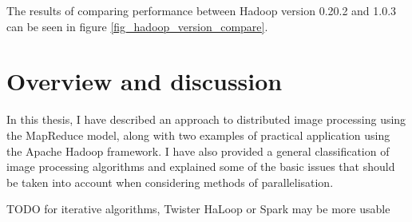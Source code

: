 \documentclass [12pt,a4paper]{report}
\begin{document}
The results of comparing performance between Hadoop version 0.20.2 and 1.0.3 can be seen in figure \ref{fig_hadoop_version_compare}.



\chapter{Overview and discussion}

In this thesis, I have described an approach to distributed image processing using the MapReduce model, along with two examples of practical application using the Apache Hadoop framework. I have also provided a general classification of image processing algorithms and explained some of the basic issues that should be taken into account when considering methods of parallelisation. 

TODO for iterative algorithms, Twister HaLoop or Spark may be more usable

\clearpage
{}


\end{document}
